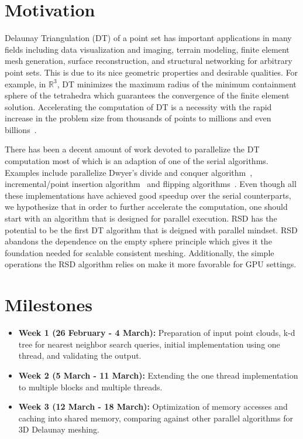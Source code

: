 \documentclass[12pt] {article}
\begin{document}
\section*{Motivation}
Delaunay Triangulation (DT) of a point set has important applications in many fields including data visualization and imaging, terrain modeling, finite element mesh generation, surface reconstruction, and structural networking for arbitrary point sets. This is due to its nice geometric properties and desirable qualities. For example, in $\mathbb{R}^{3}$, DT minimizes the maximum radius of the minimum containment sphere of the tetrahedra which guarantees the convergence of the finite element solution. Accelerating the computation of DT is a necessity with the rapid increase in the problem size from thousands of points to millions and even billions~\citep{lo20153d}. 

There has been a decent amount of work devoted to parallelize the DT computation most of which is an adaption of one of the serial algorithms. Examples include parallelize Dwyer's divide and conquer algorithm~\citep{fuetterling2014high, cignoni1998dewall, 574023, lo20153d}, incremental/point insertion algorithm~\citep{cao2014gpu, batista2010parallel} and flipping algorithms~\citep{liparulo2015fuzzy}. Even though all these implementations have achieved good speedup over the serial counterparts, we hypothesize that in order to further accelerate the computation, one should start with an algorithm that is designed for parallel execution. RSD has the potential to be the first DT algorithm that is deigned with parallel mindset. RSD abandons the dependence on the empty sphere principle which gives it the foundation needed for scalable consistent meshing. Additionally, the simple operations the RSD algorithm relies on make it more favorable for GPU settings. 



\section*{Milestones}
\begin{itemize}
\item \textbf{Week 1 (26 February - 4 March):} Preparation of input point clouds, k-d tree for nearest neighbor search queries, initial implementation using one thread, and validating the output.   
\item \textbf{Week 2 (5 March - 11 March):}  Extending the one thread implementation to multiple blocks and multiple threads. 
\item \textbf{Week 3 (12 March - 18 March):} Optimization of memory accesses and caching into shared memory, comparing against other parallel algorithms for 3D Delaunay meshing.   
 
\end{itemize}
\end{document}
